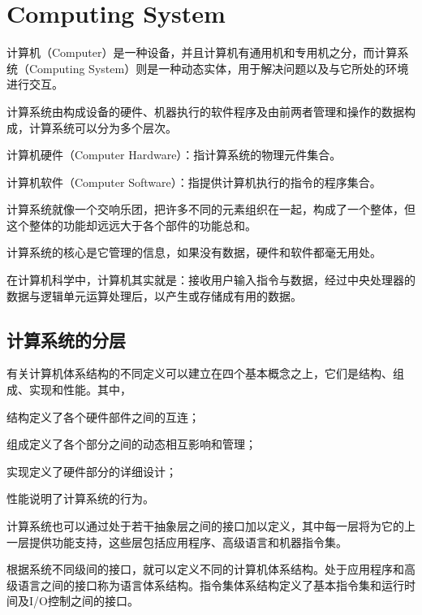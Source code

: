 \part{Computing System}

计算机（Computer）是一种设备，并且计算机有通用机和专用机之分，而计算系统（Computing System）则是一种动态实体，用于解决问题以及与它所处的环境进行交互。

计算系统由构成设备的硬件、机器执行的软件程序及由前两者管理和操作的数据构成，计算系统可以分为多个层次。

\begin{compactitem}
\item 计算机硬件（Computer Hardware）：指计算系统的物理元件集合。
\item 计算机软件（Computer Software）：指提供计算机执行的指令的程序集合。
\end{compactitem}

计算系统就像一个交响乐团，把许多不同的元素组织在一起，构成了一个整体，但这个整体的功能却远远大于各个部件的功能总和。

计算系统的核心是它管理的信息，如果没有数据，硬件和软件都毫无用处。

在计算机科学中，计算机其实就是：接收用户输入指令与数据，经过中央处理器的数据与逻辑单元运算处理后，以产生或存储成有用的数据。

\chapter{计算系统的分层}

有关计算机体系结构的不同定义可以建立在四个基本概念之上，它们是结构、组成、实现和性能。其中，
\begin{compactitem}
\item 结构定义了各个硬件部件之间的互连；
\item 组成定义了各个部分之间的动态相互影响和管理；
\item 实现定义了硬件部分的详细设计；
\item 性能说明了计算系统的行为。
\end{compactitem}

计算系统也可以通过处于若干抽象层之间的接口加以定义，其中每一层将为它的上一层提供功能支持，这些层包括应用程序、高级语言和机器指令集。

根据系统不同级间的接口，就可以定义不同的计算机体系结构。处于应用程序和高级语言之间的接口称为语言体系结构。指令集体系结构定义了基本指令集和运行时间及I/O控制之间的接口。

